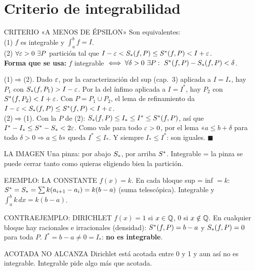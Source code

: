 \section{Criterio de integrabilidad}
\apuntes
\begin{sello}{CRITERIO «A MENOS DE ÉPSILON»}
Son equivalentes:\\[2pt]
(1) $f$ es integrable y $\int_a^bf=I$.\\
(2) $\forall\varepsilon>0\ \exists P$ partición tal que $I-\varepsilon<S_{*}(f,P)\le S^{*}(f,P)<I+\varepsilon$.\\[3pt]
\textbf{Forma que se usa:} $f$ integrable $\iff\forall\delta>0\ \exists P:\ S^{*}(f,P)-S_{*}(f,P)<\delta$.
\end{sello}
\begin{demo}
(1)$\Rightarrow$(2). Dado $\varepsilon$, por la caracterización del sup (cap.\ 3) aplicada a $I=I_*$, hay $P_1$ con $S_{*}(f,P_1)>I-\varepsilon$. Por la del ínfimo aplicada a $I=I^*$, hay $P_2$ con $S^{*}(f,P_2)<I+\varepsilon$. Con $P=P_1\cup P_2$, el lema de refinamiento da $I-\varepsilon<S_{*}(f,P)\le S^{*}(f,P)<I+\varepsilon$.\\[3pt]
(2)$\Rightarrow$(1). Con la $P$ de (2): $S_{*}(f,P)\le I_*\le I^*\le S^{*}(f,P)$, así que $I^*-I_*\le S^{*}-S_{*}<2\varepsilon$. Como vale para todo $\varepsilon>0$, por el lema «$a\le b+\delta$ para todo $\delta>0\Rightarrow a\le b$» queda $I^*\le I_*$. Y siempre $I_*\le I^*$: son iguales. $\blacksquare$
\end{demo}
\begin{tip}{LA IMAGEN}
Una pinza: por abajo $S_{*}$, por arriba $S^{*}$. Integrable = la pinza se puede cerrar tanto como quieras eligiendo bien la partición.
\end{tip}

\apuntes
\begin{sello}{EJEMPLO: LA CONSTANTE}
$f(x)=k$. En cada bloque sup = inf $=k$: $S^{*}=S_{*}=\sum k(a_{i+1}-a_i)=k(b-a)$ (suma telescópica). Integrable y $\int_a^bk\,dx=k(b-a)$.
\end{sello}
\apuntes
\begin{sello}{CONTRAEJEMPLO: DIRICHLET}
$f(x)=1$ si $x\in\mathbb{Q}$, $0$ si $x\notin\mathbb{Q}$. En cualquier bloque hay racionales e irracionales (densidad): $S^{*}(f,P)=b-a$ y $S_{*}(f,P)=0$ para toda $P$. $I^*=b-a\neq0=I_*$: \textbf{no es integrable}.
\end{sello}
\begin{trampa}{ACOTADA NO ALCANZA}
Dirichlet está acotada entre 0 y 1 y aun así no es integrable. Integrable pide algo más que acotada.
\end{trampa}

